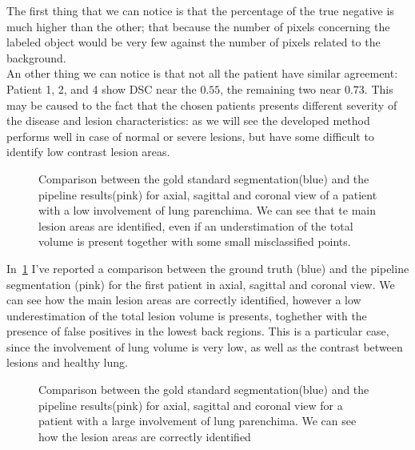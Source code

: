 \documentclass{standalone}
\begin{document}
	The first thing that we can notice is that the percentage of the true negative is much higher than the other; that because the number of pixels concerning the labeled object would be very few against the number of pixels related to the background.\\ An other thing we can notice is that not all the patient have similar agreement: Patient 1, 2, and 4 show DSC near the $0.55$, the remaining two near $0.73$. This may be caused to the fact that the chosen patients presents different severity of the disease and lesion characteristics: as we will see the developed method performs well in case of normal or severe lesions, but have some difficult to identify low contrast lesion areas. 
	 	
 		\begin{figure}[h!]
 		\centering
 			\caption{Comparison between the gold standard segmentation(blue) and the pipeline results(pink) for axial, sagittal and coronal view of a patient with a low involvement of lung parenchima. We can see that te main lesion areas are identified, even if an understimation of the total volume is present together with some small misclassified points.}\label{fig:pat1}
 		\end{figure}
 	
 	In \figurename\,\ref{fig:pat1} I've reported a comparison between the ground truth (blue) and the pipeline segmentation (pink) for the first patient in axial, sagittal and coronal view. We can see how the main lesion areas are correctly identified, however a low underestimation of the total lesion volume is presents, toghether with the presence of false positives in the lowest back regions. This is a particular case, since the involvement of lung volume is very low, as well as the contrast between lesions and healthy lung.
 	
 	
 		\begin{figure}[h!]
 			\centering
 		\caption{Comparison between the gold standard segmentation(blue) and the pipeline results(pink) for axial, sagittal and coronal view for a patient with a large involvement of lung parenchima. We can see how the lesion areas are correctly identified}\label{fig:pat3}
 		\end{figure}
 	
\end{document}
